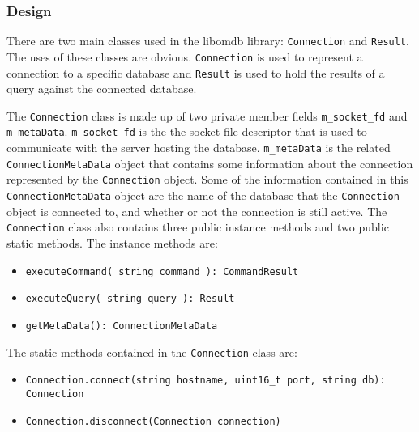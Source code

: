 \documentclass[letterpaper, 12pt]{article}
\begin{document}
  \par\vspace{\baselineskip}
  
  \subsubsection{Design}
  There are two main classes used in the libomdb library: 
  \lstinline[basicstyle=\ttfamily]|Connection| and
  \lstinline[basicstyle=\ttfamily]|Result|.
  The uses of these classes are obvious. 
  \lstinline[basicstyle=\ttfamily]|Connection| is used to represent a connection to 
  a specific database and 
  \lstinline[basicstyle=\ttfamily]|Result| is used to hold the results of a 
  query against the connected database. 
  
  \par\vspace{\baselineskip}
  The \lstinline[basicstyle=\ttfamily]|Connection| class is made up of two private 
  member fields \lstinline[basicstyle=\ttfamily]|m_socket_fd| and
  \lstinline[basicstyle=\ttfamily]|m_metaData|. 
  \lstinline[basicstyle=\ttfamily]|m_socket_fd| is the the socket file descriptor that is
  used to communicate with the server hosting the database. 
  \lstinline[basicstyle=\ttfamily]|m_metaData| is the related
  \lstinline[basicstyle=\ttfamily]|ConnectionMetaData| object that contains some 
  information about the connection represented by the 
  \lstinline[basicstyle=\ttfamily]|Connection| object. Some of the information contained
  in this \lstinline[basicstyle=\ttfamily]|ConnectionMetaData| object are 
  the name of the database that the \lstinline[basicstyle=\ttfamily]|Connection| object
  is connected to, and whether or not the connection is still active. The 
  \lstinline[basicstyle=\ttfamily]|Connection| class also contains three public 
  instance methods and two public static methods. The instance methods are:
  \begin{itemize}
    \item \lstinline[basicstyle=\ttfamily]|executeCommand( string command ): CommandResult|
    \item \lstinline[basicstyle=\ttfamily]|executeQuery( string query ): Result|
    \item \lstinline[basicstyle=\ttfamily]|getMetaData(): ConnectionMetaData| 
  \end{itemize}   
  The static methods contained in the \lstinline[basicstyle=\ttfamily]|Connection| class
  are: 
  \begin{itemize}
  	\item \lstinline[basicstyle=\ttfamily]|Connection.connect(string hostname, uint16_t port, string db): Connection|
  	\item \lstinline[basicstyle=\ttfamily]|Connection.disconnect(Connection connection)|
  \end{itemize}    
\end{document}

